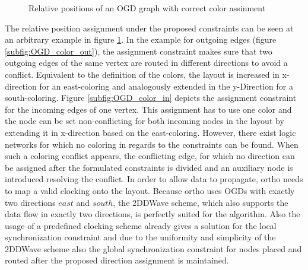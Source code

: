 \begin{figure}
	\centering
	
	\caption{Relative positions of an OGD graph with correct color assinment}\label{fig:OGD_color}
\end{figure}

The relative position assignment under the proposed constraints can be seen at an arbitrary example in figure \ref{fig:OGD_color}. In the example for outgoing edges (figure \ref{subfig:OGD_color_out}), the assignment constraint makes sure that two outgoing edges of the same vertex are routed in different directions to avoid a conflict. Equivalent to the definition of the colors, the layout is increased in x-direction for an east-coloring and analogously extended in the y-Direction for a south-coloring. Figure \ref{subfig:OGD_color_in} depicts the assignment constraint for the incoming edges of one vertex. This assignment has to use one color and the node can be set non-conflicting for both incoming nodes in the layout by extending it in x-direction based on the east-coloring. However, there exist logic networks for which no coloring in regards to the constraints can be found. When such a coloring conflict appears, the conflicting edge, for which no direction can be assigned after the formulated constraints is divided and an auxiliary node is introduced resolving the conflict.
In order to allow data to propagate, ortho needs to map a valid clocking onto the layout. 
Because ortho uses OGDs with exactly two directions $east$ and $south$, the 2DDWave scheme, which also supports the data flow in exactly two directions, is perfectly suited for the algorithm. Also the usage of a predefined clocking scheme already gives a solution for the local synchronization constraint and due to the uniformity and simplicity of the 2DDWave scheme also the global synchronization constraint for nodes placed and routed after the proposed direction assignment is maintained.

